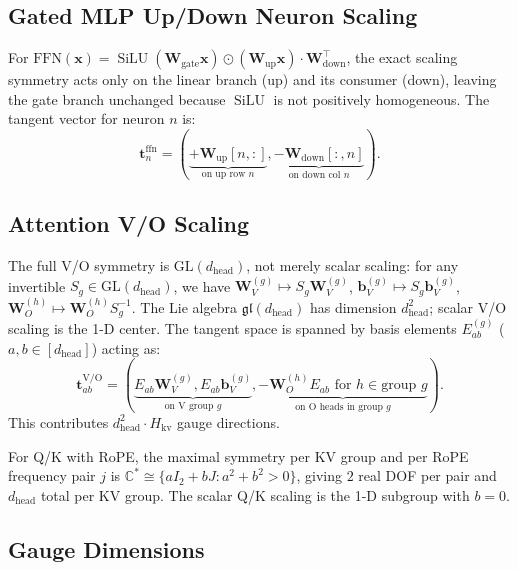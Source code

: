 \documentclass{article}
\newcommand{\bx}{\mathbf{x}}
\newcommand{\bW}{\mathbf{W}}
\DeclareMathOperator{\SiLU}{SiLU}
\begin{document}
\subsection{Gated MLP Up/Down Neuron Scaling}

For $\text{FFN}(\bx) = \SiLU(\bW_\text{gate}\bx) \odot (\bW_\text{up}\bx) \cdot \bW_\text{down}^\top$, the exact scaling symmetry acts only on the linear branch (up) and its consumer (down), leaving the gate branch unchanged because $\SiLU$ is not positively homogeneous. The tangent vector for neuron $n$ is:
\begin{equation}
 \mathbf{t}_n^{\text{ffn}} = (\underbrace{+\bW_\text{up}[n,:]}_{\text{on up row } n}, \underbrace{-\bW_\text{down}[:,n]}_{\text{on down col } n}).
\end{equation}

\subsection{Attention V/O Scaling}

The full V/O symmetry is $\mathrm{GL}(d_\text{head})$, not merely scalar scaling: for any invertible $S_g \in \mathrm{GL}(d_\text{head})$, we have $\bW_V^{(g)} \mapsto S_g \bW_V^{(g)}$, $\mathbf{b}_V^{(g)} \mapsto S_g \mathbf{b}_V^{(g)}$, $\bW_O^{(h)} \mapsto \bW_O^{(h)} S_g^{-1}$. The Lie algebra $\mathfrak{gl}(d_\text{head})$ has dimension $d_\text{head}^2$; scalar V/O scaling is the 1-D center. The tangent space is spanned by basis elements $E_{ab}^{(g)}$ ($a,b \in [d_\text{head}]$) acting as:
\begin{equation}
 \mathbf{t}_{ab}^{\text{V/O}} = (\underbrace{E_{ab} \bW_V^{(g)}, E_{ab} \mathbf{b}_V^{(g)}}_{\text{on V group } g}, \underbrace{-\bW_O^{(h)} E_{ab} \text{ for } h \in \text{group } g}_{\text{on O heads in group } g}).
\end{equation}
This contributes $d_\text{head}^2 \cdot H_{\text{kv}}$ gauge directions.

For Q/K with RoPE, the maximal symmetry per KV group and per RoPE frequency pair $j$ is $\mathbb{C}^* \cong \{aI_2 + bJ : a^2{+}b^2 > 0\}$, giving $2$ real DOF per pair and $d_\text{head}$ total per KV group. The scalar Q/K scaling is the 1-D subgroup with $b=0$.

\subsection{Gauge Dimensions}
\end{document}
